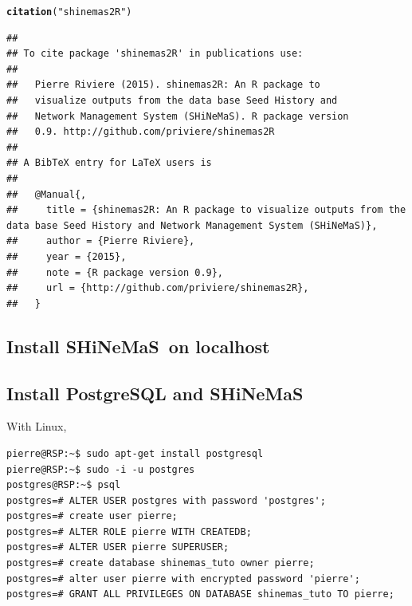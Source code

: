 \documentclass{article}\usepackage[]{graphicx}\usepackage[]{color}
\makeatletter
\newcommand{\hlstr}[1]{\textcolor[rgb]{0.192,0.494,0.8}{#1}}%
\newcommand{\hlstd}[1]{\textcolor[rgb]{0.345,0.345,0.345}{#1}}%
\newcommand{\hlkwd}[1]{\textcolor[rgb]{0.737,0.353,0.396}{\textbf{#1}}}%
\newenvironment{kframe}{%
 \def\at@end@of@kframe{}%
 \ifinner\ifhmode%
  \def\at@end@of@kframe{\end{minipage}}%
  \begin{minipage}{\columnwidth}%
 \fi\fi%
 \def\FrameCommand##1{\hskip\@totalleftmargin \hskip-\fboxsep
 \colorbox{shadecolor}{##1}\hskip-\fboxsep
     \hskip-\linewidth \hskip-\@totalleftmargin \hskip\columnwidth}%
 \MakeFramed {\advance\hsize-\width
   \@totalleftmargin\z@ \linewidth\hsize
   \@setminipage}}%
 {\par\unskip\endMakeFramed%
 \at@end@of@kframe}
\newenvironment{knitrout}{}{} %
\newcommand{\BD}{SHiNeMaS}
\makeatother
\begin{document}
\begin{itemize}
\begin{knitrout}
\color{fgcolor}\begin{kframe}
\begin{alltt}
\hlkwd{citation}\hlstd{(}\hlstr{"shinemas2R"}\hlstd{)}
\end{alltt}
\begin{verbatim}
## 
## To cite package 'shinemas2R' in publications use:
## 
##   Pierre Riviere (2015). shinemas2R: An R package to
##   visualize outputs from the data base Seed History and
##   Network Management System (SHiNeMaS). R package version
##   0.9. http://github.com/priviere/shinemas2R
## 
## A BibTeX entry for LaTeX users is
## 
##   @Manual{,
##     title = {shinemas2R: An R package to visualize outputs from the data base Seed History and Network Management System (SHiNeMaS)},
##     author = {Pierre Riviere},
##     year = {2015},
##     note = {R package version 0.9},
##     url = {http://github.com/priviere/shinemas2R},
##   }
\end{verbatim}
\end{kframe}
\end{knitrout}

\newpage



\newpage

\begin{appendices}


\section{Install \BD~on localhost}
\label{install_shinemas}

\subsection{Install PostgreSQL and \BD}

With Linux,
\begin{verbatim}
pierre@RSP:~$ sudo apt-get install postgresql
pierre@RSP:~$ sudo -i -u postgres
postgres@RSP:~$ psql
postgres=# ALTER USER postgres with password 'postgres';
postgres=# create user pierre;
postgres=# ALTER ROLE pierre WITH CREATEDB;
postgres=# ALTER USER pierre SUPERUSER;
postgres=# create database shinemas_tuto owner pierre;
postgres=# alter user pierre with encrypted password 'pierre';
postgres=# GRANT ALL PRIVILEGES ON DATABASE shinemas_tuto TO pierre;
\end{verbatim}



\end{appendices}
\end{itemize}
\end{document}
